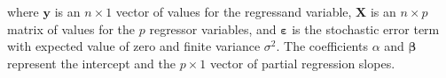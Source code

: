 \noindent where
$\mathbf{y}$
is an $n \times 1$ vector of values for the regressand variable,
$\mathbf{X}$
is an $n \times p$ matrix of values for the $p$ regressor variables,
and
$\boldsymbol{\varepsilon}$
is the stochastic error term
with expected value of zero and finite variance $\sigma^2$.
The coefficients
$\alpha$
and
$\boldsymbol{\beta}$
represent
the intercept
and the $p \times 1$
vector of partial regression slopes.




